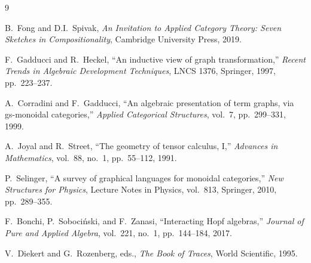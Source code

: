 \documentclass[11pt]{article}
\begin{document}
    \begin{thebibliography}{9}

        B.~Fong and D.I.~Spivak,
        \emph{An Invitation to Applied Category Theory: Seven Sketches in Compositionality},
        Cambridge University Press, 2019.

        F.~Gadducci and R.~Heckel,
        ``An inductive view of graph transformation,''
        \emph{Recent Trends in Algebraic Development Techniques}, LNCS 1376, Springer,
        1997, pp.~223--237.

        A.~Corradini and F.~Gadducci,
        ``An algebraic presentation of term graphs, via gs-monoidal categories,''
        \emph{Applied Categorical Structures}, vol.~7, pp.~299--331, 1999.

        A.~Joyal and R.~Street,
        ``The geometry of tensor calculus, I,''
        \emph{Advances in Mathematics}, vol.~88, no.~1, pp.~55--112, 1991.

        P.~Selinger,
        ``A survey of graphical languages for monoidal categories,''
        \emph{New Structures for Physics}, Lecture Notes in Physics, vol.~813, Springer,
        2010, pp.~289--355.

        F.~Bonchi, P.~Soboci\'{n}ski, and F.~Zanasi,
        ``Interacting Hopf algebras,''
        \emph{Journal of Pure and Applied Algebra}, vol.~221, no.~1, pp.~144--184, 2017.

        V.~Diekert and G.~Rozenberg, eds.,
        \emph{The Book of Traces},
        World Scientific, 1995.

    \end{thebibliography}
\end{document}
